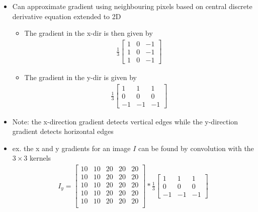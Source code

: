 \documentclass[letterpaper,12pt]{article}
\begin{document}
\begin{itemize}
 \item Can approximate gradient using neighbouring pixels based on central discrete derivative equation extended to 2D
       \begin{itemize}
        \item The gradient in the x-dir is then given by
              \begin{align}
               \frac{1}{3}\begin{bmatrix}
                1 & 0 & -1 \\
                1 & 0 & -1 \\
                1 & 0 & -1
               \end{bmatrix}
              \end{align}
        \item The gradient in the y-dir is given by
              \begin{align}
               \frac{1}{3}\begin{bmatrix}
                1  & 1  & 1  \\
                0  & 0  & 0  \\
                -1 & -1 & -1
               \end{bmatrix}
              \end{align}
       \end{itemize}
 \item Note: the x-direction gradient detects vertical edges while the y-direction gradient detects horizontal edges
 \item ex. the x and y gradients for an image $I$ can be found by convolution with the $3 \times 3$ kernels
       \begin{align}
        I_y =
        \begin{bmatrix}
         10 & 10 & 20 & 20 & 20 \\
         10 & 10 & 20 & 20 & 20 \\
         10 & 10 & 20 & 20 & 20 \\
         10 & 10 & 20 & 20 & 20 \\
         10 & 10 & 20 & 20 & 20 \\
        \end{bmatrix}
        * \frac{1}{3}\begin{bmatrix}
         1  & 1  & 1  \\
         0  & 0  & 0  \\
         -1 & -1 & -1
        \end{bmatrix}

\end{align}
\end{itemize}
\end{document}
